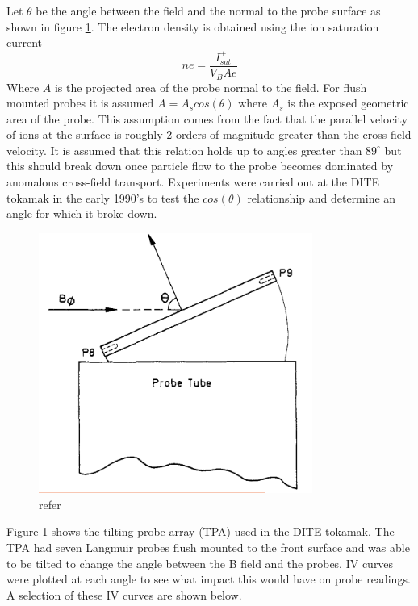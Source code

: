 \documentclass[12pt]{article}
\def\be{\begin{equation}}
\def\ee{\end{equation}}
\begin{document}
Let $\theta$ be the angle between the field and the normal to the probe surface as shown in figure \ref{fig:angle}. The electron density is obtained using the ion saturation current 
\be
ne = \frac{I^+_{sat}}{V_B A e} 
\ee
Where $A$ is the projected area of the probe normal to the field. For flush mounted probes it is assumed $A = A_s cos(\theta)$ where $A_s$ is the exposed geometric area of the probe. This assumption comes from the fact that the parallel velocity of ions at the surface is roughly 2 orders of magnitude greater than the cross-field velocity. It is assumed that this relation holds up to angles greater than $89 ^{\circ}$ but this should break down once particle flow to the probe becomes dominated by anomalous cross-field transport. Experiments were carried out at the DITE tokamak in the early 1990's to test the $cos(\theta)$ relationship and determine an angle for which it broke down. 
\begin{figure}[H]
\centering
\includegraphics[width=0.8\textwidth]{angle}
\caption{refer \cite{tilting}}
\label{fig:angle}
\end{figure}
Figure \ref{fig:angle} shows the tilting probe array (TPA) used in the DITE tokamak. The TPA had seven Langmuir probes flush mounted to the front surface and was able to be tilted to change the angle between the B field and the probes. IV curves were plotted at each angle to see what impact this would have on probe readings. A selection of these IV curves are shown below. 
\end{document}
